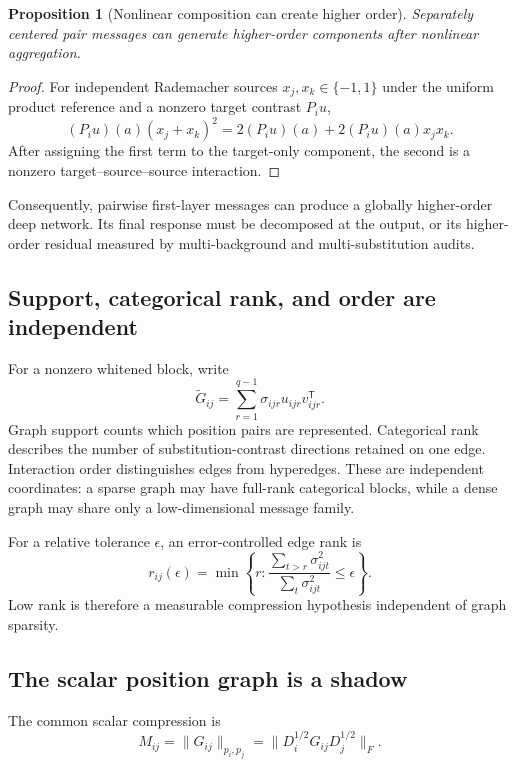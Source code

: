 \documentclass[10pt]{article}
\newtheorem{proposition}[theorem]{Proposition}
\theoremstyle{definition}
\theoremstyle{remark}
\newcommand{\BookInsert}[1]{}
\newcommand{\BookSection}[1]{\subsection{#1}}
\begin{document}
\BookInsert{chapters/05_random_energy_high_order}

\begin{proposition}[Nonlinear composition can create higher order]
\label{prop:nonlinear-nonclosure}
Separately centered pair messages can generate higher-order components after nonlinear
aggregation.
\end{proposition}

\begin{proof}
For independent Rademacher sources $x_j,x_k\in\{-1,1\}$ under the uniform product reference and a
nonzero target contrast $P_i u$,
\begin{equation}
(P_i u)(a)(x_j+x_k)^2
=2(P_i u)(a)+2(P_i u)(a)x_jx_k.
\end{equation}
After assigning the first term to the target-only component, the second is a nonzero
target--source--source interaction.
\end{proof}

Consequently, pairwise first-layer messages can produce a globally higher-order deep network.  Its
final response must be decomposed at the output, or its higher-order residual measured by
multi-background and multi-substitution audits.

\BookSection{Support, categorical rank, and order are independent}

For a nonzero whitened block, write
\begin{equation}
\widetilde G_{ij}
=\sum_{r=1}^{q-1}\sigma_{ijr}u_{ijr}v_{ijr}^{\mathsf T}.
\label{eq:block-svd}
\end{equation}
Graph support counts which position pairs are represented.  Categorical rank describes the number
of substitution-contrast directions retained on one edge.  Interaction order distinguishes edges
from hyperedges.  These are independent coordinates: a sparse graph may have
full-rank categorical blocks, while a dense graph may share only a low-dimensional message family.

For a relative tolerance $\epsilon$, an error-controlled edge rank is
\begin{equation}
r_{ij}(\epsilon)=\min\left\{r:
\frac{\sum_{t>r}\sigma_{ijt}^2}{\sum_t\sigma_{ijt}^2}\leq\epsilon\right\}.
\label{eq:approx-rank}
\end{equation}
Low rank is therefore a measurable compression hypothesis independent of graph sparsity.

\BookSection{The scalar position graph is a shadow}

The common scalar compression is
\begin{equation}
M_{ij}=\|G_{ij}\|_{p_i,p_j}
=\|D_i^{1/2}G_{ij}D_j^{1/2}\|_F.
\label{eq:scalar-shadow}
\end{equation}
\end{document}
